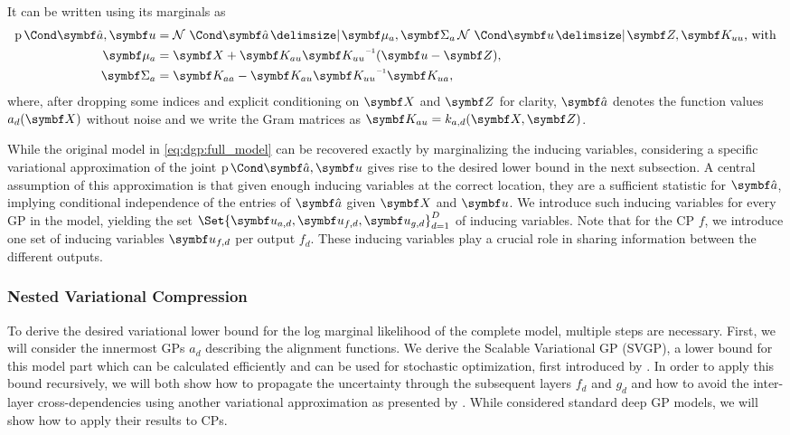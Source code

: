 It can be written using its marginals \parencite{titsias_variational_2009} as
\begin{align}
    \label{eq:dgp:augmented_joint}
    \begin{split}
        \Prob{\rv{\hat{a}}, \rv{u}} &= \Gaussian{\rv{\hat{a}} \given \mat{\mu_a}, \mat{\Sigma_a}}\Gaussian{\rv{u} \given \rv{Z}, \mat{K_{uu}}}\text{, with} \\
        \mat{\mu_a} &= \mat{X} + \mat{K_{au}}\mat{K_{uu}}\inv(\rv{u} - \mat{Z}), \\
        \mat{\Sigma_a} &= \mat{K_{aa}} - \mat{K_{au}}\mat{K_{uu}}\inv\mat{K_{ua}},
    \end{split}
\end{align}
where, after dropping some indices and explicit conditioning on $\mat{X}$ and $\mat{Z}$ for clarity, $\rv{\hat{a}}$ denotes the function values $a_d(\mat{X})$ without noise and we write the Gram matrices as $\mat{K_{au}} = k_{a, d}(\mat{X}, \mat{Z})$.

While the original model in \cref{eq:dgp:full_model} can be recovered exactly by marginalizing the inducing variables, considering a specific variational approximation of the joint $\Prob{\rv{\hat{a}}, \rv{u}}$ gives rise to the desired lower bound in the next subsection.
A central assumption of this approximation \parencite{titsias_variational_2009} is that given enough inducing variables at the correct location, they are a sufficient statistic for $\rv{\hat{a}}$, implying conditional independence of the entries of $\rv{\hat{a}}$ given $\mat{X}$ and $\rv{u}$.
We introduce such inducing variables for every GP in the model, yielding the set $\Set{\rv{u_{a, d}}, \rv{u_{f, d}}, \rv{u_{g, d}}}_{d=1}^D$ of inducing variables.
Note that for the CP $f$, we introduce one set of inducing variables $\rv{u_{f, d}}$ per output $f_d$.
These inducing variables play a crucial role in sharing information between the different outputs.


\subsubsection{Nested Variational Compression}
To derive the desired variational lower bound for the log marginal likelihood of the complete model, multiple steps are necessary.
First, we will consider the innermost GPs $a_d$ describing the alignment functions.
We derive the Scalable Variational GP (SVGP), a lower bound for this model part which can be calculated efficiently and can be used for stochastic optimization, first introduced by \textcite{hensman_gaussian_2013}.
In order to apply this bound recursively, we will both show how to propagate the uncertainty through the subsequent layers $f_d$ and $g_d$ and how to avoid the inter-layer cross-dependencies using another variational approximation as presented by \textcite{hensman_nested_2014}.
While \citeauthor{hensman_nested_2014} considered standard deep GP models, we will show how to apply their results to CPs.

